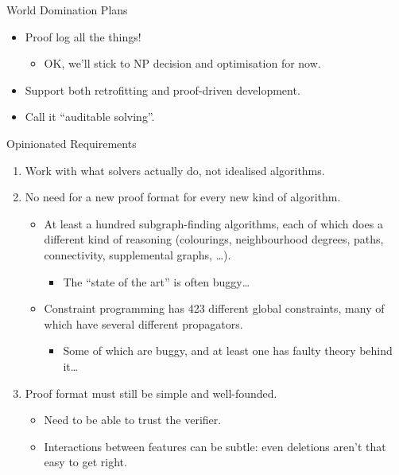 \documentclass{beamer}
\begin{document}
\begin{frame}{World Domination Plans}
    \begin{itemize}
        \item Proof log all the things!
            \begin{itemize}
                \item OK, we'll stick to NP decision and optimisation for now.
            \end{itemize}
        \item Support both retrofitting and proof-driven development.
        \item Call it ``auditable solving''.
    \end{itemize}
\end{frame}

\begin{frame}{Opinionated Requirements}
    \begin{enumerate}
        \item Work with what solvers actually do, not idealised algorithms.
        \item No need for a new proof format for every new kind of algorithm.
            \begin{itemize}
                \item At least a hundred subgraph-finding algorithms, each of which does a different
                    kind of reasoning (colourings, neighbourhood degrees, paths, connectivity,
                    supplemental graphs, \ldots).
                    \begin{itemize}
                        \item The ``state of the art'' is often buggy\ldots
                    \end{itemize}
                \item Constraint programming has 423 different global constraints, many of which
                    have several different propagators.
                    \begin{itemize}
                        \item Some of which are buggy, and at least one has faulty theory behind it\ldots
                    \end{itemize}
            \end{itemize}
        \item Proof format must still be simple and well-founded.
            \begin{itemize}
                \item Need to be able to trust the verifier.
                \item Interactions between features can be subtle: even deletions aren't that easy
                    to get right.
            \end{itemize}
    \end{enumerate}
\end{frame}
\end{document}
